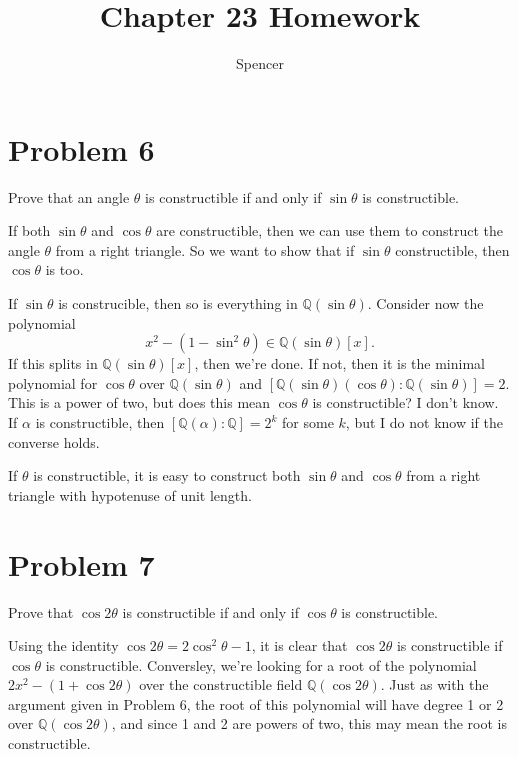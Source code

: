 \documentclass{article}
\title{Chapter 23 Homework}
\author{Spencer}
\begin{document}
\maketitle

\newcommand{\Z}{\mathbb{Z}}
\newcommand{\R}{\mathbb{R}}
\newcommand{\N}{\mathbb{N}}
\newcommand{\Q}{\mathbb{Q}}

\section*{Problem 6}

Prove that an angle $\theta$ is constructible if and only if $\sin\theta$ is constructible.

If both $\sin\theta$ and $\cos\theta$ are constructible, then we can use them
to construct the angle $\theta$ from a right triangle.  So we want to show that
if $\sin\theta$ constructible, then $\cos\theta$ is too.

If $\sin\theta$ is construcible, then so is everything in $\Q(\sin\theta)$.
Consider now the polynomial
\begin{equation*}
x^2-(1-\sin^2\theta)\in\Q(\sin\theta)[x].
\end{equation*}
If this splits in $\Q(\sin\theta)[x]$, then we're done.  If not, then it is
the minimal polynomial for $\cos\theta$ over $\Q(\sin\theta)$ and
$[\Q(\sin\theta)(\cos\theta):\Q(\sin\theta)]=2$.  This is a power of two, but
does this mean $\cos\theta$ is constructible?  I don't know.
If $\alpha$ is constructible, then $[\Q(\alpha):\Q]=2^k$ for some $k$, but I do not
know if the converse holds.

If $\theta$ is constructible, it is easy to construct both $\sin\theta$ and $\cos\theta$
from a right triangle with hypotenuse of unit length.

\section*{Problem 7}

Prove that $\cos 2\theta$ is constructible if and only if $\cos\theta$ is constructible.

Using the identity $\cos 2\theta=2\cos^2\theta-1$, it is clear that $\cos 2\theta$ is
constructible if $\cos\theta$ is constructible.  Conversley, we're looking for a
root of the polynomial $2x^2-(1+\cos 2\theta)$ over the constructible field $\Q(\cos 2\theta)$.
Just as with the argument given in Problem 6, the root of this polynomial will have degree
1 or 2 over $\Q(\cos 2\theta)$, and since 1 and 2 are powers of two, this may mean the root
is constructible.
\end{document}
